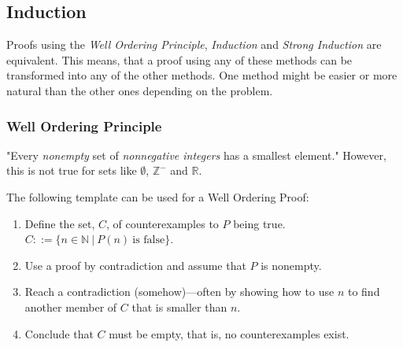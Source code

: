 \documentclass[../main.tex]{subfiles}
\begin{document}
\subsection{Induction}

Proofs using the \textit{Well Ordering Principle}, \textit{Induction} and \textit{Strong Induction} are equivalent. This means, that a proof using any of these methods can be transformed into any of the other methods. One method might be easier or more natural than the other ones depending on the problem.

\subsubsection{Well Ordering Principle}

"Every \textit{nonempty} set of \textit{nonnegative integers} has a smallest element." However, this is not true for sets like $\emptyset$, $\mathbb{Z}^-$ and $\mathbb{R}$.

The following template can be used for a Well Ordering Proof:

\begin{enumerate}
  \item Define the set, $C$, of counterexamples to $P$ being true. $C ::= \{n \in \mathbb{N}\ |\ P(n)\ \text{is false}\}$.
  \item Use a proof by contradiction and assume that $P$ is nonempty.
  \item Reach a contradiction (somehow)---often by showing how to use $n$ to find another member of $C$ that is smaller than $n$.
  \item Conclude that $C$ must be empty, that is, no counterexamples exist.
\end{enumerate}
\end{document}
